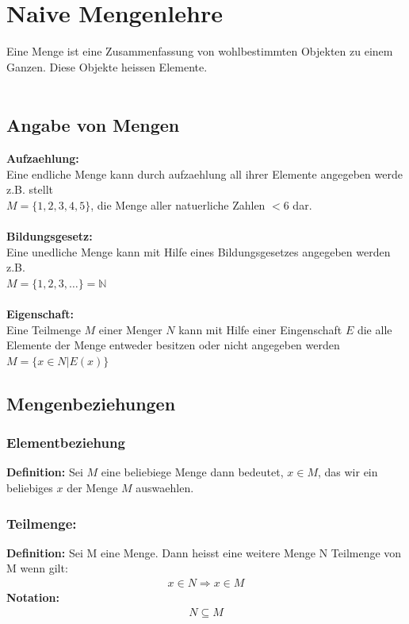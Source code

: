\documentclass[../AbiMappe_Mathe.tex]{subfiles}
\begin{document}
\theoremstyle{nonumberplain}



\section{Naive Mengenlehre}
Eine Menge ist eine Zusammenfassung von wohlbestimmten Objekten zu einem Ganzen.
Diese Objekte heissen Elemente.\\\\


\subsection{Angabe von Mengen}
\textbf{Aufzaehlung:}\\
Eine endliche Menge kann durch aufzaehlung all ihrer Elemente angegeben werde z.B. stellt\\ $M=\{1,2,3,4,5\}$, die Menge aller natuerliche Zahlen $<6$ dar.\\\\
\textbf{Bildungsgesetz:}\\
Eine unedliche Menge kann mit Hilfe eines Bildungsgesetzes angegeben werden z.B. \\$M=\{1,2,3,\dots\}=\mathbb{N}$\\\\
\textbf{Eigenschaft:}\\
Eine Teilmenge $M$ einer Menger $N$ kann mit Hilfe einer Eingenschaft $E$ die alle Elemente der Menge entweder besitzen oder nicht angegeben werden $M=\{x \in N|E(x)\}$

\subsection{Mengenbeziehungen}

\subsubsection{Elementbeziehung}
\textbf{Definition:} Sei $M$ eine beliebiege Menge dann bedeutet, $x \in M$, das wir ein beliebiges $x$ der Menge $M$ auswaehlen.

\subsubsection{Teilmenge:}
\textbf{Definition:} Sei M eine Menge. Dann heisst eine weitere Menge N Teilmenge von M wenn gilt:
\begin{align*}
x \in N \Rightarrow x \in M
\end{align*}
\textbf{Notation:} 
\begin{align*}
N \subseteq M
\end{align*}
\end{document}
